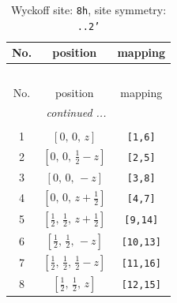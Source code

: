 \documentclass[fleqn,8pt]{jsarticle}
\begin{document}
\begin{longtable}{ccc}
\caption{Wyckoff site: {\tt 8h}, site symmetry: {\tt ..2'}}
 \\
 \hline \hline
No. & position & mapping \\ \hline \endfirsthead

\multicolumn{2}{l}{\tablename\ \thetable{}} \\
 \hline \hline
No. & position & mapping \\ \hline \endhead

 \hline \hline
\multicolumn{2}{r}{\footnotesize\it continued ...} \\ \endfoot

 \hline \hline
\multicolumn{2}{r}{} \\ \endlastfoot

1 & $\left[ 0,\, 0,\, z \right]$ & {\tt [1,6]} \\ \hline
2 & $\left[ 0,\, 0,\, \frac{1}{2} - z \right]$ & {\tt [2,5]} \\ \hline
3 & $\left[ 0,\, 0,\, - z \right]$ & {\tt [3,8]} \\ \hline
4 & $\left[ 0,\, 0,\, z + \frac{1}{2} \right]$ & {\tt [4,7]} \\ \hline
5 & $\left[ \frac{1}{2},\, \frac{1}{2},\, z + \frac{1}{2} \right]$ & {\tt [9,14]} \\ \hline
6 & $\left[ \frac{1}{2},\, \frac{1}{2},\, - z \right]$ & {\tt [10,13]} \\ \hline
7 & $\left[ \frac{1}{2},\, \frac{1}{2},\, \frac{1}{2} - z \right]$ & {\tt [11,16]} \\ \hline
8 & $\left[ \frac{1}{2},\, \frac{1}{2},\, z \right]$ & {\tt [12,15]} \\
\end{longtable}
\renewcommand{\arraystretch}{1.2}
\end{document}
